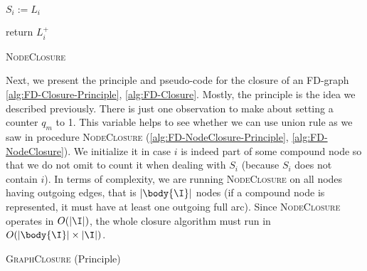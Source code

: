 \begin{algorithm}
	
	\BlankLine
	\BlankLine	
	
	$S_i := L_i$ \;
	
	return $L_i^+$ \;
	\caption{\textsc{NodeClosure}}
	\label{alg:FD-NodeClosure}
\end{algorithm}

\vspace{1.2em}

Next, we present the principle and pseudo-code for the closure of an FD-graph
\ref{alg:FD-Closure-Principle}, \ref{alg:FD-Closure}. Mostly, the principle is 
the idea we described previously. There is just one observation to make about 
setting a counter $q_m$ to 1. This variable helps to see whether we can use 
union rule as we saw in procedure \textsc{NodeClosure}
(\ref{alg:FD-NodeClosure-Principle}, \ref{alg:FD-NodeClosure}). We initialize it
in case $i$ is indeed part of some compound node so that we do not omit to count
it when dealing with $S_i$ (because $S_i$ does not contain $i$). In terms of
complexity, we are running \textsc{NodeClosure} on all nodes having outgoing
edges, that is $|\body{\I}|$ nodes (if a compound node is represented, it must
have at least one outgoing full arc). Since \textsc{NodeClosure} operates in
$O(|\I|)$, the whole closure algorithm must run in $O(|\body{\I}| \times |\I|)$.

\begin{algorithm}
	
	\BlankLine
	\BlankLine
	
	
	\caption{\textsc{GraphClosure} (Principle)}
	\label{alg:FD-Closure-Principle}
\end{algorithm}


